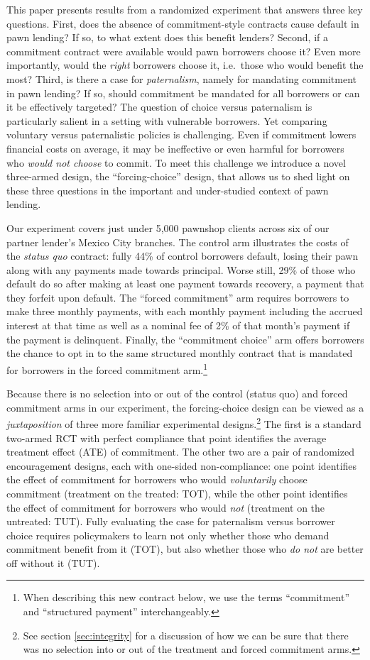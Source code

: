\documentclass[12pt, a4paper]{article}
\begin{document}
This paper presents results from a randomized experiment that answers three key questions. First, does the absence of commitment-style contracts cause default in pawn lending? If so, to what extent does this benefit lenders? Second, if a commitment contract were available would pawn borrowers choose it? Even more importantly, would the \emph{right} borrowers choose it, i.e.\ those who would benefit the most? Third, is there a case for \emph{paternalism}, namely for mandating commitment in pawn lending? If so, should commitment be mandated for all borrowers or can it be effectively targeted? The question of choice versus paternalism is particularly salient in a setting with vulnerable borrowers. Yet comparing voluntary versus paternalistic policies is challenging. Even if commitment lowers financial costs on average, it may be ineffective or even harmful for borrowers who \emph{would not choose} to commit. To meet this challenge we introduce a novel three-armed design, the ``forcing-choice'' design, that allows us to shed light on these three questions in the important and under-studied context of pawn lending. 

Our experiment covers just under 5,000 pawnshop clients across six of our partner lender's Mexico City branches. The control arm illustrates the costs of the \emph{status quo} contract: fully 44\% of control borrowers default, losing their pawn along with any payments made towards principal. Worse still, 29\% of those who default do so after making at least one payment towards recovery, a payment that they forfeit upon default. The ``forced commitment'' arm requires borrowers to make three monthly payments, with each monthly payment including the accrued interest at that time as well as a nominal fee of 2\% of that month's payment if the payment is delinquent.  Finally, the ``commitment choice'' arm offers borrowers the chance to opt in to the same structured monthly contract that is mandated for borrowers in the forced commitment arm.\footnote{When describing this new contract below, we use the terms ``commitment'' and ``structured payment'' interchangeably.}

Because there is no selection into or out of the control (status quo) and forced commitment arms in our experiment, the forcing-choice design can be viewed as a \emph{juxtaposition} of three more familiar experimental designs.\footnote{See section \ref{sec:integrity} for a discussion of how we can be sure that there was no selection into or out of the treatment and forced commitment arms.} The first is a standard two-armed RCT with perfect compliance that point identifies the average treatment effect (ATE) of commitment. The other two are a pair of randomized encouragement designs, each with one-sided non-compliance: one point identifies the effect of commitment for borrowers who would \emph{voluntarily} choose commitment (treatment on the treated: TOT), while the other point identifies the effect of commitment for borrowers who would \emph{not} (treatment on the untreated: TUT). 
Fully evaluating the case for paternalism versus borrower choice requires policymakers to learn not only whether those who demand commitment benefit from it (TOT), but also whether those who \emph{do not} are better off without it (TUT).
\end{document}

